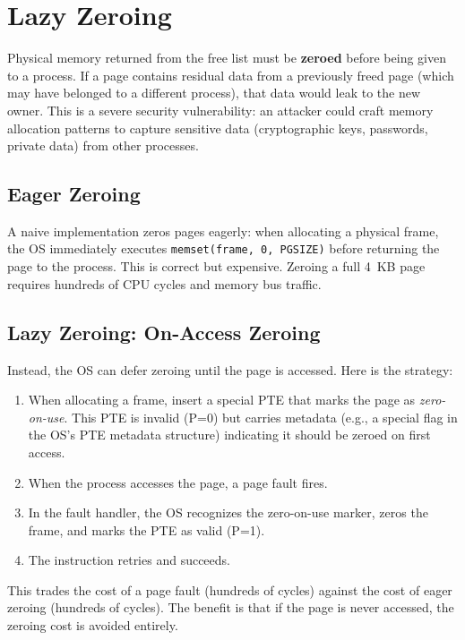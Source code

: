 \documentclass[11pt]{article}
\begin{document}
\section{Lazy Zeroing}

Physical memory returned from the free list must be \textbf{zeroed} before being given to a process. If a page contains residual data from a previously freed page (which may have belonged to a different process), that data would leak to the new owner. This is a severe security vulnerability: an attacker could craft memory allocation patterns to capture sensitive data (cryptographic keys, passwords, private data) from other processes.

\subsection{Eager Zeroing}

A naive implementation zeros pages eagerly: when allocating a physical frame, the OS immediately executes \texttt{memset(frame, 0, PGSIZE)} before returning the page to the process. This is correct but expensive. Zeroing a full 4~KB page requires hundreds of CPU cycles and memory bus traffic.

\subsection{Lazy Zeroing: On-Access Zeroing}

Instead, the OS can defer zeroing until the page is accessed. Here is the strategy:

\begin{enumerate}
    \item When allocating a frame, insert a special PTE that marks the page as \emph{zero-on-use}. This PTE is invalid (P=0) but carries metadata (e.g., a special flag in the OS's PTE metadata structure) indicating it should be zeroed on first access.
    \item When the process accesses the page, a page fault fires.
    \item In the fault handler, the OS recognizes the zero-on-use marker, zeros the frame, and marks the PTE as valid (P=1).
    \item The instruction retries and succeeds.
\end{enumerate}

This trades the cost of a page fault (hundreds of cycles) against the cost of eager zeroing (hundreds of cycles). The benefit is that if the page is never accessed, the zeroing cost is avoided entirely.
\end{document}
